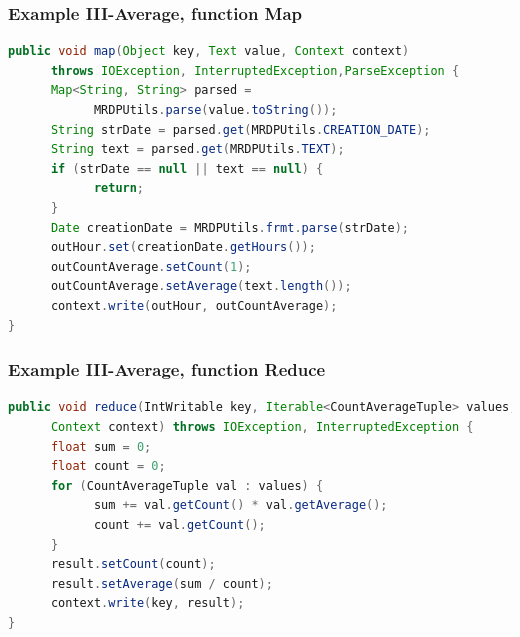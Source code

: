 \documentclass[xcolor=dvipsnames,dvip,notes=show,table]{beamer}
\begin{document}


\begin{frame}[fragile]
  \frametitle{Example III-Average, function Map}

\begin{lstlisting}[language=Java]
public void map(Object key, Text value, Context context)
      throws IOException, InterruptedException,ParseException {
      Map<String, String> parsed = 
            MRDPUtils.parse(value.toString());
      String strDate = parsed.get(MRDPUtils.CREATION_DATE);
      String text = parsed.get(MRDPUtils.TEXT);
      if (strDate == null || text == null) {
            return;
      }
      Date creationDate = MRDPUtils.frmt.parse(strDate);
      outHour.set(creationDate.getHours());
      outCountAverage.setCount(1);
      outCountAverage.setAverage(text.length());
      context.write(outHour, outCountAverage);
}
\end{lstlisting}

\end{frame}

\begin{frame}[fragile]
  \frametitle{Example III-Average, function Reduce}

\begin{lstlisting}[language=Java]
public void reduce(IntWritable key, Iterable<CountAverageTuple> values,
      Context context) throws IOException, InterruptedException {
      float sum = 0;
      float count = 0;
      for (CountAverageTuple val : values) {
            sum += val.getCount() * val.getAverage();
            count += val.getCount();
      }
      result.setCount(count);
      result.setAverage(sum / count);
      context.write(key, result);
}
\end{lstlisting}

\end{frame}
\end{document}
